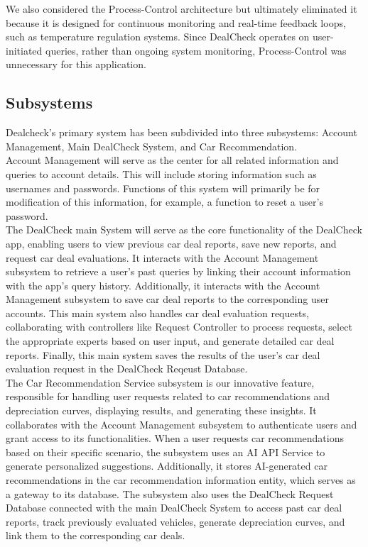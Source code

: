 \documentclass[]{article}
\begin{document}
We also considered the Process-Control architecture but ultimately eliminated it because it is designed for continuous monitoring and real-time feedback loops, such as temperature regulation systems. Since DealCheck operates on user-initiated queries, rather than ongoing system monitoring, Process-Control was unnecessary for this application.\\

\subsection{Subsystems}
\label{sub:subsystems}

Dealcheck’s primary system has been subdivided into three subsystems: Account Management, Main DealCheck System, and Car Recommendation. \\

Account Management will serve as the center for all related information and queries to account details. This will include storing information such as usernames and passwords. Functions of this system will primarily be for modification of this information, for example, a function to reset a user’s password. \\

The DealCheck main System will serve as the core functionality of the DealCheck app, enabling users to view previous car deal reports, save new reports, and request car deal evaluations. It interacts with the Account Management subsystem to retrieve a user's past queries by linking their account information with the app's query history. Additionally, it interacts with the Account Management subsystem to save car deal reports to the corresponding user accounts. This main system also handles car deal evaluation requests, collaborating with controllers like Request Controller to process requests, select the appropriate experts based on user input, and generate detailed car deal reports. Finally, this main system saves the results of the user's car deal evaluation request in the DealCheck Reqeust Database. \\

The Car Recommendation Service subsystem is our innovative feature, responsible for handling user requests related to car recommendations and depreciation curves, displaying results, and generating these insights. It collaborates with the Account Management subsystem to authenticate users and grant access to its functionalities. When a user requests car recommendations based on their specific scenario, the subsystem uses an AI API Service to generate personalized suggestions. Additionally, it stores AI-generated car recommendations in the car recommendation information entity, which serves as a gateway to its database. The subsystem also uses the DealCheck Request Database connected with the main DealCheck System to access past car deal reports, track previously evaluated vehicles, generate depreciation curves, and link them to the corresponding car deals.
\end{document}
